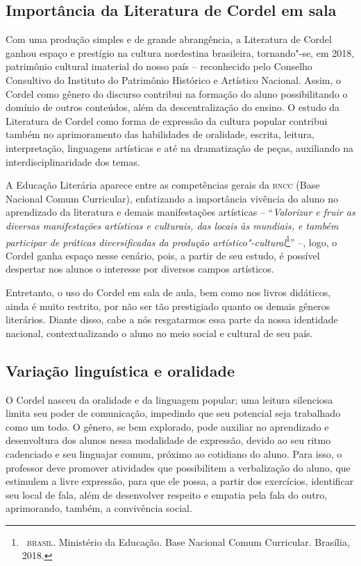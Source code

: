 \documentclass[12pt]{extarticle}
\begin{document}
\subsection{Importância da Literatura de Cordel em sala}

Com uma produção simples e de grande abrangência, a Literatura de Cordel
ganhou espaço e prestígio na cultura nordestina brasileira, tornando"-se,
em 2018, patrimônio cultural imaterial do nosso país -- reconhecido pelo
Conselho Consultivo do Instituto do Patrimônio Histórico e Artístico
Nacional. Assim, o Cordel como gênero do discurso contribui na formação
do aluno possibilitando o domínio de outros conteúdos, além da
descentralização do ensino. O estudo da Literatura de Cordel como forma
de expressão da cultura popular contribui também no aprimoramento das
habilidades de oralidade, escrita, leitura, interpretação, linguagens
artísticas e até na dramatização de peças, auxiliando na
interdisciplinaridade dos temas.

A Educação Literária aparece entre as competências gerais da \textsc{bncc} (Base
Nacional Comum Curricular), enfatizando a importância vivência do aluno
no aprendizado da literatura e demais manifestações artísticas --
``\emph{Valorizar e fruir as diversas manifestações artísticas e
culturais, das locais às mundiais, e também participar de práticas
diversificadas da produção artístico"-cultural}\footnote{~\textsc{brasil}.
  Ministério da Educação. Base Nacional Comum Curricular. Brasília,
  2018.}'' --, logo, o Cordel ganha espaço nesse cenário, pois, a
partir de seu estudo, é possível despertar nos alunos o interesse por
diversos campos artísticos.

Entretanto, o uso do Cordel em sala de aula, bem como nos livros
didáticos, ainda é muito restrito, por não ser tão prestigiado quanto os
demais gêneros literários. Diante disso, cabe a nós resgatarmos essa
parte da nossa identidade nacional, contextualizando o aluno no meio
social e cultural de seu país.

\subsection{Variação linguística e oralidade}

O Cordel nasceu da oralidade e da linguagem popular; uma leitura
silenciosa limita seu poder de comunicação, impedindo que seu potencial
seja trabalhado como um todo. O gênero, se bem explorado, pode auxiliar
no aprendizado e desenvoltura dos alunos nessa modalidade de expressão,
devido ao seu ritmo cadenciado e seu linguajar comum, próximo ao
cotidiano do aluno. Para isso, o professor deve promover atividades que
possibilitem a verbalização do aluno, que estimulem a livre expressão,
para que ele possa, a partir dos exercícios, identificar seu local de
fala, além de desenvolver respeito e empatia pela fala do outro,
aprimorando, também, a convivência social.
\end{document}
